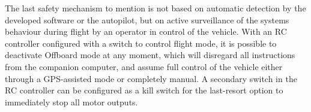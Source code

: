 The last safety mechanism to mention is not based on automatic detection by the developed software or the autopilot, but on active surveillance of the systems behaviour during flight by an operator in control of the vehicle.
With an RC controller configured with a switch to control flight mode, it is possible to deactivate Offboard mode at any moment, which will disregard all instructions from the companion computer, and assume full control of the vehicle either through a GPS-assisted mode or completely manual.
A secondary switch in the RC controller can be configured as a kill switch for the last-resort option to immediately stop all motor outputs.

